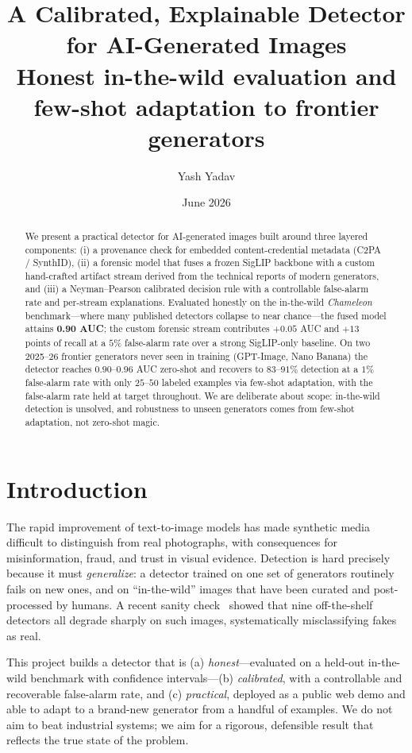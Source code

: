\documentclass[11pt]{article}
\title{\textbf{A Calibrated, Explainable Detector for AI-Generated Images}\\
\large Honest in-the-wild evaluation and few-shot adaptation to frontier generators}
\author{Yash Yadav}
\date{June 2026}
\begin{document}
\maketitle

\begin{abstract}
We present a practical detector for AI-generated images built around three layered
components: (i) a provenance check for embedded content-credential metadata
(C2PA / SynthID), (ii) a forensic model that fuses a frozen SigLIP backbone with a
custom hand-crafted artifact stream derived from the technical reports of modern
generators, and (iii) a Neyman--Pearson calibrated decision rule with a controllable
false-alarm rate and per-stream explanations. Evaluated honestly on the in-the-wild
\emph{Chameleon} benchmark---where many published detectors collapse to near chance---the
fused model attains \textbf{0.90 AUC}; the custom forensic stream contributes
$+0.05$ AUC and $+13$ points of recall at a $5\%$ false-alarm rate over a strong
SigLIP-only baseline. On two 2025--26 frontier generators never seen in training
(GPT-Image, Nano Banana) the detector reaches $0.90$--$0.96$ AUC zero-shot and
recovers to $83$--$91\%$ detection at a $1\%$ false-alarm rate with only $25$--$50$
labeled examples via few-shot adaptation, with the false-alarm rate held at target
throughout. We are deliberate about scope: in-the-wild detection is unsolved, and
robustness to unseen generators comes from few-shot adaptation, not zero-shot magic.
\end{abstract}

\section{Introduction}
The rapid improvement of text-to-image models has made synthetic media difficult to
distinguish from real photographs, with consequences for misinformation, fraud, and
trust in visual evidence. Detection is hard precisely because it must \emph{generalize}:
a detector trained on one set of generators routinely fails on new ones, and on
``in-the-wild'' images that have been curated and post-processed by humans. A recent
sanity check~\cite{aide} showed that nine off-the-shelf detectors all degrade sharply
on such images, systematically misclassifying fakes as real.

This project builds a detector that is (a) \emph{honest}---evaluated on a held-out
in-the-wild benchmark with confidence intervals---(b) \emph{calibrated}, with a
controllable and recoverable false-alarm rate, and (c) \emph{practical}, deployed as a
public web demo and able to adapt to a brand-new generator from a handful of examples.
We do not aim to beat industrial systems; we aim for a rigorous, defensible result that
reflects the true state of the problem.
\end{document}
